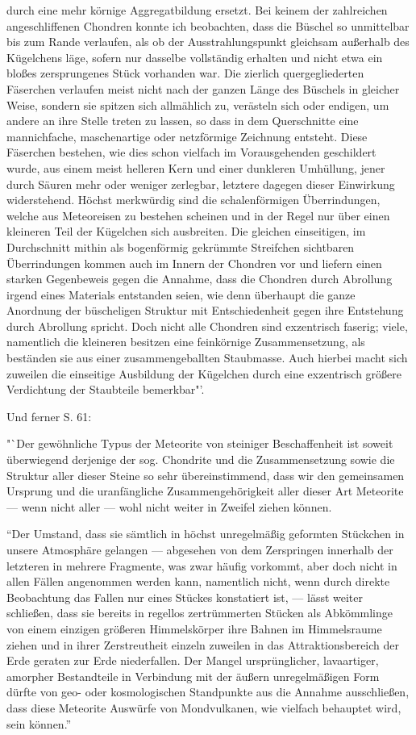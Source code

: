 \documentclass[a4paper, 12pt, oneside]{article}
\begin{document}
durch eine mehr körnige Aggregatbildung ersetzt. Bei keinem der zahlreichen angeschliffenen Chondren konnte ich beobachten, dass die Büschel so unmittelbar bis zum Rande verlaufen, als ob der Ausstrahlungspunkt gleichsam außerhalb des Kügelchens läge, sofern nur dasselbe vollständig erhalten und nicht etwa ein bloßes zersprungenes Stück vorhanden war. Die zierlich quergegliederten Fäserchen verlaufen meist nicht nach der ganzen Länge des Büschels in gleicher Weise, sondern sie spitzen sich allmählich zu, verästeln sich oder endigen, um andere an ihre Stelle treten zu lassen, so dass in dem Querschnitte eine mannichfache, maschenartige oder netzförmige Zeichnung entsteht. Diese Fäserchen bestehen, wie dies schon vielfach im Vorausgehenden geschildert wurde, aus einem meist helleren Kern und einer dunkleren Umhüllung, jener durch Säuren mehr oder weniger zerlegbar, letztere dagegen dieser Einwirkung widerstehend. Höchst merkwürdig sind die schalenförmigen Überrindungen, welche aus Meteoreisen zu bestehen scheinen und in der Regel nur über einen kleineren Teil der Kügelchen sich ausbreiten. Die gleichen einseitigen, im Durchschnitt mithin als bogenförmig gekrümmte Streifchen sichtbaren Überrindungen kommen auch im Innern der Chondren vor und liefern einen starken Gegenbeweis gegen die Annahme, dass die Chondren durch Abrollung irgend eines Materials entstanden seien, wie denn überhaupt die ganze Anordnung der büscheligen Struktur mit Entschiedenheit gegen ihre Entstehung durch Abrollung spricht. Doch nicht alle Chondren sind exzentrisch faserig; viele, namentlich die kleineren besitzen eine feinkörnige Zusammensetzung, als beständen sie aus einer zusammengeballten Staubmasse. Auch hierbei macht sich zuweilen die einseitige Ausbildung der Kügelchen durch eine exzentrisch größere Verdichtung der Staubteile bemerkbar"'.

Und ferner S. 61:

"`Der gewöhnliche Typus der Meteorite von steiniger Beschaffenheit ist soweit überwiegend derjenige der sog. Chondrite und die Zusammensetzung sowie die Struktur aller dieser Steine so sehr übereinstimmend, dass wir den gemeinsamen Ursprung und die uranfängliche Zusammengehörigkeit aller dieser Art Meteorite — wenn nicht aller — wohl nicht weiter in Zweifel ziehen können.

"`Der Umstand, dass sie sämtlich in höchst unregelmäßig geformten Stückchen in unsere Atmosphäre gelangen — abgesehen von dem Zerspringen innerhalb der letzteren in mehrere Fragmente, was zwar häufig vorkommt, aber doch nicht in allen Fällen angenommen werden kann, namentlich nicht, wenn durch direkte Beobachtung das Fallen nur eines Stückes konstatiert ist, — lässt weiter schließen, dass sie bereits in regellos zertrümmerten Stücken als Abkömmlinge von einem einzigen größeren Himmelskörper ihre Bahnen im Himmelsraume ziehen und in ihrer Zerstreutheit einzeln zuweilen in das Attraktionsbereich der Erde geraten zur Erde niederfallen. Der Mangel ursprünglicher, lavaartiger, amorpher Bestandteile in Verbindung mit der äußern unregelmäßigen Form dürfte von geo- oder kosmologischen Standpunkte aus die Annahme ausschließen, dass diese Meteorite Auswürfe von Mondvulkanen, wie vielfach behauptet wird, sein können."'
\end{document}
